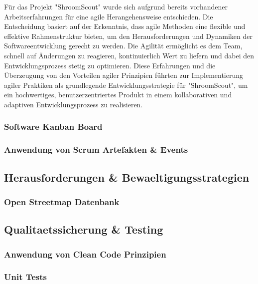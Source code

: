 \documentclass[../main.tex]{subfiles}
\begin{document}
Für das Projekt "ShroomScout" wurde sich aufgrund bereits vorhandener Arbeitserfahrungen für eine agile Herangehensweise entschieden. Die 
Entscheidung basiert auf der Erkenntnis, dass agile Methoden eine flexible und effektive Rahmenstruktur bieten, um den Herausforderungen 
und Dynamiken der Softwareentwicklung gerecht zu werden. Die Agilität ermöglicht es dem Team, schnell auf Änderungen zu reagieren, kontinuierlich 
Wert zu liefern und dabei den Entwicklungsprozess stetig zu optimieren. Diese Erfahrungen und die Überzeugung von den Vorteilen agiler Prinzipien 
führten zur Implementierung agiler Praktiken als grundlegende Entwicklungsstrategie für "ShroomScout", um ein hochwertiges, benutzerzentriertes 
Produkt in einem kollaborativen und adaptiven Entwicklungsprozess zu realisieren.

\subsubsection{Software Kanban Board}
\subsubsection{Anwendung von Scrum Artefakten \& Events}

\subsection{Herausforderungen \& Bewaeltigungsstrategien} %
\subsubsection{Open Streetmap Datenbank}

\subsection{Qualitaetssicherung \& Testing} %
\subsubsection{Anwendung von Clean Code Prinzipien}
\subsubsection{Unit Tests}
\end{document}
